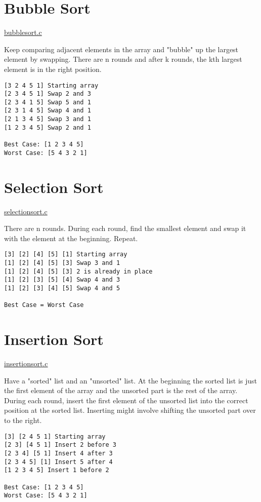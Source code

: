 \documentclass{article}
\begin{document}
\section{Bubble Sort}
\href{algos/bubblesort.c}{bubblesort.c}  \newline

Keep comparing adjacent elements in the array and "bubble" up the largest element by swapping.
There are n rounds and after k rounds, the kth largest element is in the right position.
\begin{lstlisting}
[3 2 4 5 1] Starting array
[2 3 4 5 1] Swap 2 and 3
[2 3 4 1 5] Swap 5 and 1
[2 3 1 4 5] Swap 4 and 1
[2 1 3 4 5] Swap 3 and 1
[1 2 3 4 5] Swap 2 and 1

Best Case: [1 2 3 4 5]
Worst Case: [5 4 3 2 1]
\end{lstlisting}

\section{Selection Sort}
\href{algos/selectionsort.c}{selectionsort.c}  \newline

There are n rounds. During each round, find the smallest element and swap it with the element at the beginning. Repeat.
\begin{lstlisting}
[3] [2] [4] [5] [1] Starting array
[1] [2] [4] [5] [3] Swap 3 and 1
[1] [2] [4] [5] [3] 2 is already in place
[1] [2] [3] [5] [4] Swap 4 and 3
[1] [2] [3] [4] [5] Swap 4 and 5

Best Case = Worst Case
\end{lstlisting}

\section{Insertion Sort}
\href{algos/insertionsort.c}{insertionsort.c}  \newline

Have a "sorted" list and an "unsorted" list.
At the beginning the sorted list is just the first element of the array and the unsorted part is the rest of the array.
During each round, insert the first element of the unsorted list into the correct position at the sorted list.
Inserting might involve shifting the unsorted part over to the right.
\begin{lstlisting}
[3] [2 4 5 1] Starting array
[2 3] [4 5 1] Insert 2 before 3
[2 3 4] [5 1] Insert 4 after 3
[2 3 4 5] [1] Insert 5 after 4
[1 2 3 4 5] Insert 1 before 2

Best Case: [1 2 3 4 5]
Worst Case: [5 4 3 2 1]
\end{lstlisting}
\end{document}
